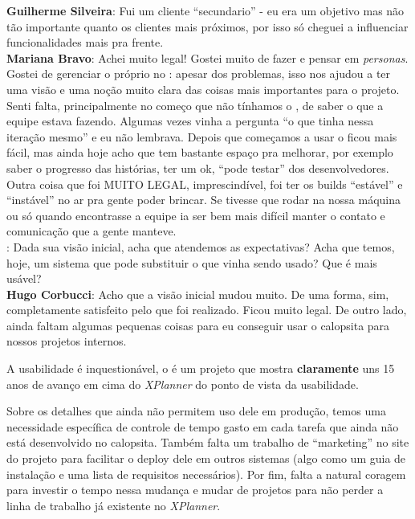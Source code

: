 \textbf{Guilherme Silveira}: Fui um cliente ``secundario'' - eu era um objetivo mas não tão importante quanto os clientes mais próximos, por isso só cheguei a influenciar funcionalidades mais pra frente. \\

\textbf{Mariana Bravo}: Achei muito legal!
Gostei muito de fazer e pensar em \textit{personas}. Gostei de gerenciar o próprio \calopsita{} no \calopsita{}: apesar dos problemas, isso nos ajudou a ter uma visão e uma noção muito clara das coisas mais importantes para o projeto.
Senti falta, principalmente no começo que não tínhamos o \calopsita{}, de saber o que a equipe estava fazendo. Algumas vezes vinha a pergunta ``o que tinha nessa iteração mesmo'' e eu não lembrava.
Depois que começamos a usar o \calopsita{} ficou mais fácil, mas ainda hoje acho que tem bastante espaço pra melhorar, por exemplo saber o progresso das histórias, ter um ok, ``pode testar'' dos desenvolvedores.
Outra coisa que foi MUITO LEGAL, imprescindível, foi ter os builds ``estável'' e ``instável'' no ar pra gente poder brincar. Se tivesse que rodar na nossa máquina ou só quando encontrasse a equipe ia ser bem mais difícil manter o contato e comunicação que a gente manteve. \\

\textbf{\calopsita{}}: Dada sua visão inicial, acha que atendemos as expectativas? Acha que temos, hoje, um sistema que pode substituir o que vinha sendo usado? Que é mais usável?\\

\textbf{Hugo Corbucci}: Acho que a visão inicial mudou muito. De uma forma, sim, completamente satisfeito pelo que foi realizado. Ficou muito legal. De outro lado, ainda faltam algumas pequenas coisas para eu conseguir usar o calopsita para nossos projetos internos.

A usabilidade é inquestionável, o \calopsita{} é um projeto que mostra \textbf{claramente} uns 15 anos de avanço em cima do \textit{XPlanner} do ponto de vista da usabilidade.

Sobre os detalhes que ainda não permitem uso dele em produção, temos uma necessidade específica de controle de tempo gasto em cada tarefa que ainda não está desenvolvido no calopsita. Também falta um trabalho de ``marketing'' no site do projeto para facilitar o deploy dele em outros sistemas (algo como um guia de instalação e uma lista de requisitos necessários). Por fim, falta a natural coragem para investir o tempo nessa mudança e mudar de projetos para não perder a linha de trabalho já existente no \textit{XPlanner}.\\

